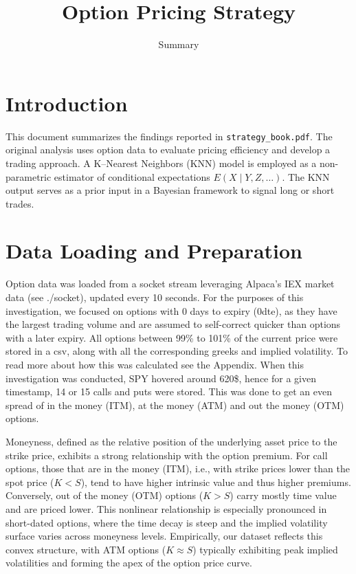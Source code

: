 \documentclass{article}
\title{Option Pricing Strategy}
\author{Summary}
\date{}
\begin{document}
\maketitle
\section{Introduction}

This document summarizes the findings reported in \texttt{strategy\_book.pdf}. The original analysis uses option data to evaluate pricing efficiency and develop a trading approach. A K--Nearest Neighbors (KNN) model is employed as a non-parametric estimator of conditional expectations $E(X\mid Y,Z,\ldots)$. The KNN output serves as a prior input in a Bayesian framework to signal long or short trades.

\section{Data Loading and Preparation}

Option data was loaded from a socket stream leveraging Alpaca's IEX market data (see ./socket), updated every 10 seconds. For the purposes of this investigation, we focused on options with 0 days to expiry (0dte), as they have the largest trading volume and are assumed to self-correct quicker than options with a later expiry. All options between 99\% to 101\% of the current price were stored in a csv, along with all the corresponding greeks and implied volatility. To read more about how this was calculated see the Appendix. When this investigation was conducted, SPY hovered around 620\$, hence for a given timestamp, 14 or 15 calls and puts were stored. This was done to get an even spread of in the money (ITM), at the money (ATM) and out the money (OTM) options.

Moneyness, defined as the relative position of the underlying asset price to the strike price, exhibits a strong relationship with the option premium. For call options, those that are in the money (ITM), i.e., with strike prices lower than the spot price (\(K < S\)), tend to have higher intrinsic value and thus higher premiums. Conversely, out of the money (OTM) options (\(K > S\)) carry mostly time value and are priced lower. This nonlinear relationship is especially pronounced in short-dated options, where the time decay is steep and the implied volatility surface varies across moneyness levels. Empirically, our dataset reflects this convex structure, with ATM options (\(K \approx S\)) typically exhibiting peak implied volatilities and forming the apex of the option price curve.
\end{document}
